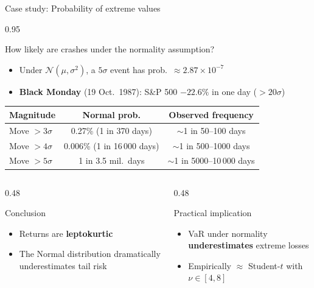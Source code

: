\documentclass[9pt, aspectratio=169, t]{beamer}
\begin{document}
\begin{frame}[shrink=5]{Case study: Probability of extreme values}
    \begin{cminipage}{0.95\textwidth}
    \begin{block}{How likely are crashes under the normality assumption?}
    \begin{itemize}\setlength{\itemsep}{0pt}
        \item Under $\mathcal{N}(\mu,\sigma^2)$, a $5\sigma$ event has prob.\ $\approx 2.87 \times 10^{-7}$
        \item \textbf{Black Monday} (19 Oct.\ 1987): S\&P 500 $-22.6\%$ in one day ($> 20\sigma$)
    \end{itemize}
    \end{block}
    \vspace{0.1cm}
    \begin{center}
    {\small
    \renewcommand{\arraystretch}{1.3}
    \begin{tabular}{lcc}
    \toprule
    \textbf{Magnitude} & \textbf{Normal prob.} & \textbf{Observed frequency} \\
    \midrule
    Move $> 3\sigma$ & 0.27\% (1 in 370 days) & $\sim$1 in 50--100 days \\
    Move $> 4\sigma$ & 0.006\% (1 in 16\,000 days) & $\sim$1 in 500--1000 days \\
    Move $> 5\sigma$ & 1 in 3.5 mil.\ days & $\sim$1 in 5000--10\,000 days \\
    \bottomrule
    \end{tabular}
    }
    \end{center}
    \vspace{0.1cm}
    \begin{columns}[T]
    \begin{column}{0.48\textwidth}
    \begin{alertblock}{Conclusion}
    \begin{itemize}\setlength{\itemsep}{0pt}
        \item Returns are \textbf{leptokurtic}
        \item The Normal distribution dramatically underestimates tail risk
    \end{itemize}
    \end{alertblock}
    \end{column}
    \begin{column}{0.48\textwidth}
    \begin{exampleblock}{Practical implication}
    \begin{itemize}\setlength{\itemsep}{0pt}
        \item VaR under normality \textbf{underestimates} extreme losses
        \item Empirically $\approx$ Student-$t$ with $\nu \in [4,8]$
    \end{itemize}
    \end{exampleblock}
    \end{column}
    \end{columns}
    \end{cminipage}
\end{frame}
\end{document}
